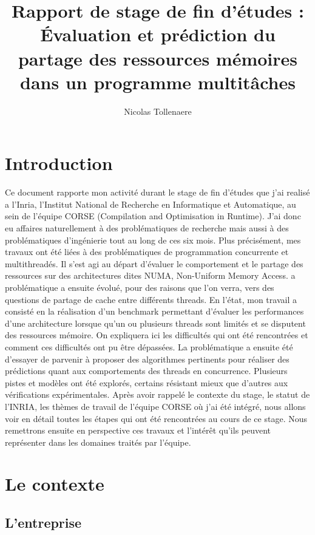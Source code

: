 \documentclass{report}
\author{Nicolas Tollenaere}
\title{Rapport de stage de fin d'études : Évaluation et prédiction du partage des ressources mémoires
dans un programme multitâches}
\begin{document}
\maketitle
\tableofcontents




\chapter{Introduction}
Ce document rapporte mon activité durant le stage de fin d'études que j'ai 
realisé a l'Inria, l'Institut National de Recherche en Informatique et
Automatique, au sein de l'équipe CORSE (Compilation and Optimisation in Runtime).
J'ai donc eu affaires naturellement à des problématiques de recherche mais aussi à
des problématiques d'ingénierie tout au long de ces six mois. Plus précisément, mes travaux ont été
liées à des problématiques de programmation concurrente et multithreadés. Il s'est agi au départ d'évaluer
le comportement et le partage des ressources sur des architectures dites NUMA, Non-Uniform Memory Access. 
a problématique a ensuite évolué, pour des raisons que l'on verra, vers des questions de partage de cache
entre différents threads.
En l'état, mon travail a consisté en la réalisation d'un benchmark permettant d'évaluer les performances
d'une architecture lorsque qu'un ou plusieurs threads sont limités et se disputent des ressources mémoire.
On expliquera ici les difficultés qui ont été rencontrées et comment ces difficultés ont pu être dépassées.
La problématique a ensuite été d'essayer de parvenir à proposer des algorithmes pertinents pour réaliser 
des prédictions quant aux comportements des threads en concurrence. 
Plusieurs pistes et modèles ont été explorés, certains résistant mieux que d'autres aux vérifications 
expérimentales.
Après avoir rappelé le contexte du stage, le statut de l'INRIA, les thèmes de travail de l'équipe CORSE où
j'ai été intégré, nous allons voir en détail toutes les étapes qui ont été rencontrées au cours de ce stage. 
Nous remettrons ensuite en perspective ces travaux et l'intérêt qu'ils peuvent représenter dans les 
domaines traités par l'équipe.

\chapter{Le contexte}
\section{L'entreprise}
\end{document}
